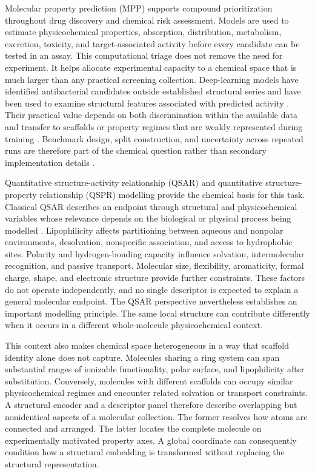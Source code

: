 \documentclass[journal=jcisd8,manuscript=article]{achemso}
\begin{document}
Molecular property prediction (MPP) supports compound prioritization throughout
drug discovery and chemical risk assessment. Models are used to estimate
physicochemical properties, absorption, distribution, metabolism, excretion,
toxicity, and target-associated activity before every candidate can be tested in
an assay. This computational triage does not remove the need for experiment. It
helps allocate experimental capacity to a chemical space that is much larger
than any practical screening collection. Deep-learning models have identified
antibacterial candidates outside established structural series and have been
used to examine structural features associated with predicted activity
\cite{Stokes2020,Wong2024}. Their practical value depends on both discrimination
within the available data and transfer to scaffolds or property regimes that
are weakly represented during training \cite{Walters2021,Segal2025}. Benchmark
design, split construction, and uncertainty across repeated runs are therefore
part of the chemical question rather than secondary implementation details
\cite{Wu2018,Sultan2024}.

Quantitative structure-activity relationship (QSAR) and quantitative
structure-property relationship (QSPR) modelling provide the chemical basis for
this task. Classical QSAR describes an endpoint through structural and
physicochemical variables whose relevance depends on the biological or physical
process being modelled \cite{Hansch1964,Cherkasov2014,Tropsha2024}. Lipophilicity
affects partitioning between aqueous and nonpolar environments, desolvation,
nonspecific association, and access to hydrophobic sites. Polarity and
hydrogen-bonding capacity influence solvation, intermolecular recognition, and
passive transport. Molecular size, flexibility, aromaticity, formal charge,
shape, and electronic structure provide further constraints. These factors do
not operate independently, and no single descriptor is expected to explain a
general molecular endpoint. The QSAR perspective nevertheless establishes an
important modelling principle. The same local structure can contribute
differently when it occurs in a different whole-molecule physicochemical
context.

This context also makes chemical space heterogeneous in a way that scaffold
identity alone does not capture. Molecules sharing a ring system can span
substantial ranges of ionizable functionality, polar surface, and
lipophilicity after substitution. Conversely, molecules with different
scaffolds can occupy similar physicochemical regimes and encounter related
solvation or transport constraints. A structural encoder and a descriptor
panel therefore describe overlapping but nonidentical aspects of a molecular
collection. The former resolves how atoms are connected and arranged. The
latter locates the complete molecule on experimentally motivated property
axes. A global coordinate can consequently condition how a structural
embedding is transformed without replacing the structural representation.
\end{document}
